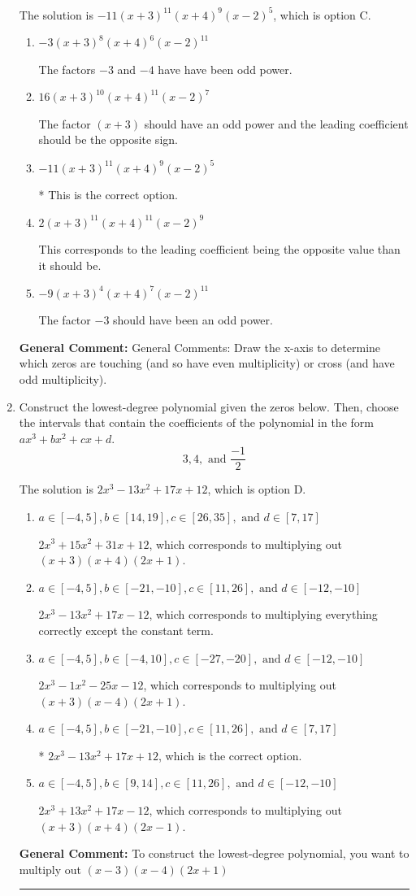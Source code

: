 \documentclass{extbook}[14pt]
\newcommand{\litem}[1]{\item #1

\rule{\textwidth}{0.4pt}}
\begin{document}
\begin{enumerate}
{The solution is \( -11(x + 3)^{11} (x + 4)^{9} (x - 2)^{5} \), which is option C.\begin{enumerate}[label=\Alph*.]
\item \( -3(x + 3)^{8} (x + 4)^{6} (x - 2)^{11} \)

The factors $-3$ and $-4$ have have been odd power.
\item \( 16(x + 3)^{10} (x + 4)^{11} (x - 2)^{7} \)

The factor $(x + 3)$ should have an odd power and the leading coefficient should be the opposite sign.
\item \( -11(x + 3)^{11} (x + 4)^{9} (x - 2)^{5} \)

* This is the correct option.
\item \( 2(x + 3)^{11} (x + 4)^{11} (x - 2)^{9} \)

This corresponds to the leading coefficient being the opposite value than it should be.
\item \( -9(x + 3)^{4} (x + 4)^{7} (x - 2)^{11} \)

The factor $-3$ should have been an odd power.
\end{enumerate}

\textbf{General Comment:} General Comments: Draw the x-axis to determine which zeros are touching (and so have even multiplicity) or cross (and have odd multiplicity).
}
\litem{
Construct the lowest-degree polynomial given the zeros below. Then, choose the intervals that contain the coefficients of the polynomial in the form $ax^3+bx^2+cx+d$.
\[ 3, 4, \text{ and } \frac{-1}{2} \]

The solution is \( 2x^{3} -13 x^{2} +17 x + 12 \), which is option D.\begin{enumerate}[label=\Alph*.]
\item \( a \in [-4, 5], b \in [14, 19], c \in [26, 35], \text{ and } d \in [7, 17] \)

$2x^{3} +15 x^{2} +31 x + 12$, which corresponds to multiplying out $(x + 3)(x + 4)(2x + 1)$.
\item \( a \in [-4, 5], b \in [-21, -10], c \in [11, 26], \text{ and } d \in [-12, -10] \)

$2x^{3} -13 x^{2} +17 x -12$, which corresponds to multiplying everything correctly except the constant term.
\item \( a \in [-4, 5], b \in [-4, 10], c \in [-27, -20], \text{ and } d \in [-12, -10] \)

$2x^{3} -1 x^{2} -25 x -12$, which corresponds to multiplying out $(x + 3)(x -4)(2x + 1)$.
\item \( a \in [-4, 5], b \in [-21, -10], c \in [11, 26], \text{ and } d \in [7, 17] \)

* $2x^{3} -13 x^{2} +17 x + 12$, which is the correct option.
\item \( a \in [-4, 5], b \in [9, 14], c \in [11, 26], \text{ and } d \in [-12, -10] \)

$2x^{3} +13 x^{2} +17 x -12$, which corresponds to multiplying out $(x + 3)(x + 4)(2x -1)$.
\end{enumerate}

\textbf{General Comment:} To construct the lowest-degree polynomial, you want to multiply out $(x -3)(x -4)(2x + 1)$
}
\end{enumerate}
\end{document}
